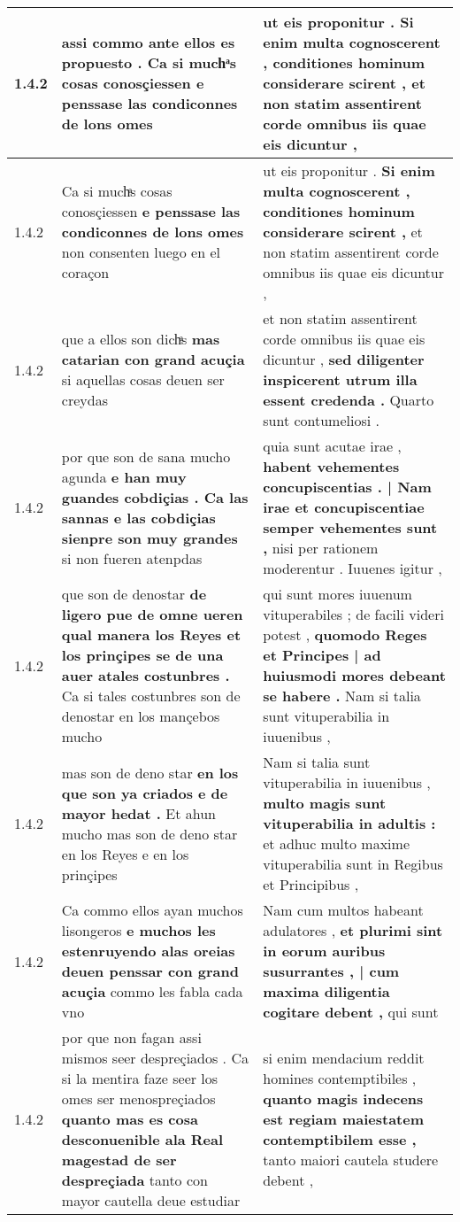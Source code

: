 \begin{tabular}{|p{1cm}|p{6.5cm}|p{6.5cm}|}
1.4.2 & assi commo ante ellos es propuesto . \textbf{ Ca si muchͣs cosas conosçiessen } e penssase las condiconnes de lons omes & ut eis proponitur . \textbf{ Si enim multa cognoscerent , conditiones hominum considerare scirent , } et non statim assentirent corde omnibus iis quae eis dicuntur , \\\hline
1.4.2 & Ca si muchͣs cosas conosçiessen \textbf{ e penssase las condiconnes de lons omes } non consenten luego en el coraçon & ut eis proponitur . \textbf{ Si enim multa cognoscerent , conditiones hominum considerare scirent , } et non statim assentirent corde omnibus iis quae eis dicuntur , \\\hline
1.4.2 & que a ellos son dichͣs \textbf{ mas catarian con grand acuçia } si aquellas cosas deuen ser creydas & et non statim assentirent corde omnibus iis quae eis dicuntur , \textbf{ sed diligenter inspicerent utrum illa essent credenda . } Quarto sunt contumeliosi . \\\hline
1.4.2 & por que son de sana mucho agunda \textbf{ e han muy guandes cobdiçias . Ca las sannas e las cobdiçias sienpre son muy grandes } si non fueren atenpdas & quia sunt acutae irae , \textbf{ habent vehementes concupiscentias . | Nam irae et concupiscentiae semper vehementes sunt , } nisi per rationem moderentur . Iuuenes igitur , \\\hline
1.4.2 & que son de denostar \textbf{ de ligero pue de omne ueren qual manera los Reyes et los prinçipes se de una auer atales costunbres . } Ca si tales costunbres son de denostar en los mançebos mucho & qui sunt mores iuuenum vituperabiles ; de facili videri potest , \textbf{ quomodo Reges et Principes | ad huiusmodi mores debeant se habere . } Nam si talia sunt vituperabilia in iuuenibus , \\\hline
1.4.2 & mas son de deno star \textbf{ en los que son ya criados e de mayor hedat . } Et ahun mucho mas son de deno star en los Reyes e en los prinçipes & Nam si talia sunt vituperabilia in iuuenibus , \textbf{ multo magis sunt vituperabilia in adultis : } et adhuc multo maxime vituperabilia sunt in Regibus et Principibus , \\\hline
1.4.2 & Ca commo ellos ayan muchos lisongeros \textbf{ e muchos les estenruyendo alas oreias deuen penssar con grand acuçia } commo les fabla cada vno & Nam cum multos habeant adulatores , \textbf{ et plurimi sint in eorum auribus susurrantes , | cum maxima diligentia cogitare debent , } qui sunt \\\hline
1.4.2 & por que non fagan assi mismos seer despreçiados . Ca si la mentira faze seer los omes ser menospreçiados \textbf{ quanto mas es cosa desconuenible ala Real magestad de ser despreçiada } tanto con mayor cautella deue estudiar & si enim mendacium reddit homines contemptibiles , \textbf{ quanto magis indecens est regiam maiestatem contemptibilem esse , } tanto maiori cautela studere debent , \\\hline

\end{tabular}
